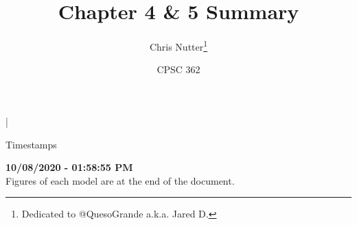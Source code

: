 \documentclass[12pt]{article}
\title{Chapter 4 \& 5 Summary}
\author{Chris Nutter\thanks{Dedicated to @QuesoGrande a.k.a. Jared D.}}
\date{CPSC 362}
\renewcommand{\abstractname}{\small{\begin{center}Timestamps\end{center}\vspace{-4ex}}}
\begin{document}
\maketitle

\begin{center} \vspace{-4ex}|\vspace{-3ex} \end{center}

\noindent\abstractname
\begin{center}
    \normalsize\textbf{10/08/2020 - 01:58:55 PM}\\
    Figures of each model are at the end of the document.
\end{center}
\normalsize

\tableofcontents    
\vspace{4ex}

\end{document}
